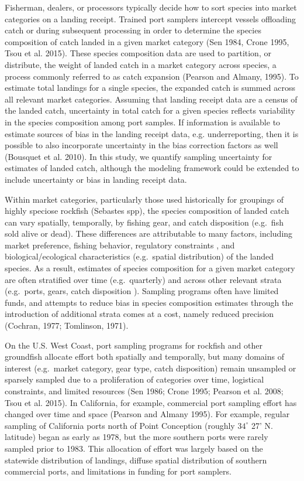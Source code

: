 \documentclass[12pt]{article}
\begin{document}
Fisherman, dealers, or processors typically decide how to sort species
into market categories on a landing receipt. Trained port samplers
intercept vessels offloading catch or during subsequent processing in
order to determine the species composition of catch landed in a given
market category (Sen 1984, Crone 1995, Tsou et al. 2015). These species
composition data are used to partition, or distribute, the weight of
landed catch in a market category across species, a process commonly
referred to as catch expansion (Pearson and Almany, 1995). To estimate
total landings for a single species, the expanded catch is summed across
all relevant market categories. Assuming that landing receipt data are a
census of the landed catch, uncertainty in total catch for a given
species reflects variability in the species composition among port
samples. If information is available to estimate sources of bias in the
landing receipt data, e.g. underreporting, then it is possible to also
incorporate uncertainty in the bias correction factors as well (Bousquet
et al. 2010). In this study, we quantify sampling uncertainty for
estimates of landed catch, although the modeling framework could be
extended to include uncertainty or bias in landing receipt data.

Within market categories, particularly those used historically for
groupings of highly speciose rockfish (Sebastes spp), the species
composition of landed catch can vary spatially, temporally, by fishing
gear, and catch disposition (e.g.~fish sold alive or dead). These
differences are attributable to many factors, including market
preference, fishing behavior, regulatory constraints , and
biological/ecological characteristics (e.g.~spatial distribution) of the
landed species. As a result, estimates of species composition for a
given market category are often stratified over time (e.g.~quarterly)
and across other relevant strata (e.g.~ports, gears, catch disposition
). Sampling programs often have limited funds, and attempts to reduce
bias in species composition estimates through the introduction of
additional strata comes at a cost, namely reduced precision (Cochran,
1977; Tomlinson, 1971).

On the U.S. West Coast, port sampling programs for rockfish and other
groundfish allocate effort both spatially and temporally, but many
domains of interest (e.g.~market category, gear type, catch disposition)
remain unsampled or sparsely sampled due to a proliferation of
categories over time, logistical constraints, and limited resources (Sen
1986; Crone 1995; Pearson et al. 2008; Tsou et al. 2015). In California,
for example, commercial port sampling effort has changed over time and
space (Pearson and Almany 1995). For example, regular sampling of
California ports north of Point Conception (roughly \(34^{\circ}\) 27'
N. latitude) began as early as 1978, but the more southern ports were
rarely sampled prior to 1983. This allocation of effort was largely
based on the statewide distribution of landings, diffuse spatial
distribution of southern commercial ports, and limitations in funding
for port samplers.
\end{document}
